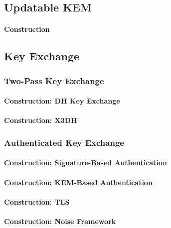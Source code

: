 \documentclass[a4paper,orivec]{llncs}
\begin{document}
\subsection{Updatable KEM}

\paragraph{Construction}


\subsection{Key Exchange}

\subsubsection{Two-Pass Key Exchange}

\paragraph{Construction: DH Key Exchange}

\paragraph{Construction: X3DH}

\subsubsection{Authenticated Key Exchange}

\paragraph{Construction: Signature-Based Authentication}

\paragraph{Construction: KEM-Based Authentication}

\paragraph{Construction: TLS}

\paragraph{Construction: Noise Framework}
\end{document}

